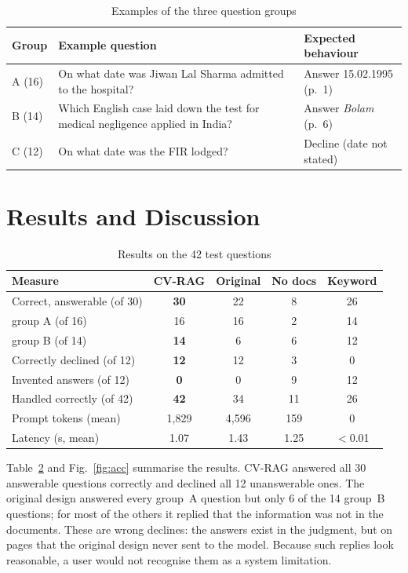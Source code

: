 \documentclass[conference]{IEEEtran}
\begin{document}
\begin{table}[t]
\centering
\caption{Examples of the three question groups}
\label{tab:groups}
\footnotesize
\begin{tabular}{p{1.1cm}p{3.8cm}p{2.4cm}}
\toprule
\textbf{Group} & \textbf{Example question} & \textbf{Expected behaviour}\\
\midrule
A (16) & On what date was Jiwan Lal Sharma admitted to the hospital? & Answer 15.02.1995 (p.~1)\\
B (14) & Which English case laid down the test for medical negligence applied in India? & Answer \emph{Bolam} (p.~6)\\
C (12) & On what date was the FIR lodged? & Decline (date not stated)\\
\bottomrule
\end{tabular}
\end{table}

\section{Results and Discussion}

\begin{table}[t]
\centering
\caption{Results on the 42 test questions}
\label{tab:results}
\footnotesize
\setlength{\tabcolsep}{3pt}
\begin{tabular}{lcccc}
\toprule
\textbf{Measure} & \textbf{CV-RAG} & \textbf{Original} & \textbf{No docs} & \textbf{Keyword}\\
\midrule
Correct, answerable (of 30) & \textbf{30} & 22 & 8 & 26\\
\quad group A (of 16) & 16 & 16 & 2 & 14\\
\quad group B (of 14) & \textbf{14} & 6 & 6 & 12\\
Correctly declined (of 12) & \textbf{12} & 12 & 3 & 0\\
Invented answers (of 12) & \textbf{0} & 0 & 9 & 12\\
Handled correctly (of 42) & \textbf{42} & 34 & 11 & 26\\
Prompt tokens (mean) & 1,829 & 4,596 & 159 & 0\\
Latency (s, mean) & 1.07 & 1.43 & 1.25 & $<$0.01\\
\bottomrule
\end{tabular}
\end{table}

Table~\ref{tab:results} and Fig.~\ref{fig:acc} summarise the results. CV-RAG answered all 30 answerable questions correctly and declined all 12 unanswerable ones. The original design answered every group~A question but only 6 of the 14 group~B questions; for most of the others it replied that the information was not in the documents. These are wrong declines: the answers exist in the judgment, but on pages that the original design never sent to the model. Because such replies look reasonable, a user would not recognise them as a system limitation.
\end{document}
